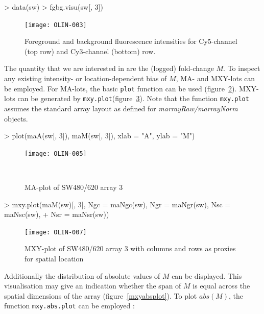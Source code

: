 \documentclass[a4paper,11pt]{article}
\begin{document}
\begin{Schunk}
\begin{Sinput}
> data(sw)
> fgbg.visu(sw[, 3])
\end{Sinput}
\end{Schunk}

\begin{figure}
\centering
\texttt{[image: OLIN-003]}
\caption{Foreground and background fluorescence intensities for Cy5-channel (top row) and Cy3-channel (bottom) row.}
\label{fgbg}
\end{figure}

The  quantity that we are interested in are the (logged) fold-change $M$. To inspect
any existing intensity- or location-dependent bias of $M$, MA- and MXY-lots can be employed.
For MA-lots, the basic \texttt{plot} function can be used (figure~\ref{maplot}). 
MXY-lots can be generated 
by \texttt{mxy.plot}(figure~\ref{mxyplot}). 
Note that the function   \texttt{mxy.plot} assumes the standard array
layout as defined for \textit{marrayRaw/marrayNorm} objects.
  
\begin{Schunk}
\begin{Sinput}
> plot(maA(sw[, 3]), maM(sw[, 3]), xlab = "A", ylab = "M")
\end{Sinput}
\end{Schunk}

\begin{figure}[t]
\centering
\texttt{[image: OLIN-005]}
\caption{MA-plot of SW480/620 array 3}\
\label{maplot}
\end{figure}


\begin{Schunk}
\begin{Sinput}
> mxy.plot(maM(sw)[, 3], Ngc = maNgc(sw), Ngr = maNgr(sw), Nsc = maNsc(sw),
+ Nsr = maNsr(sw))
\end{Sinput}
\end{Schunk}

\begin{figure}
\centering
\texttt{[image: OLIN-007]}
\caption{MXY-plot of SW480/620 array 3 with columns and rows as proxies for spatial location}
\label{mxyplot}
\end{figure}

Additionally the distribution of absolute values of $M$ can be displayed. This visualisation
may give an indication whether the span of $M$ is equal across the spatial dimensions of
the array (figure~\ref{mxyabsplot}). 
To plot $abs(M)$, the function \texttt{mxy.abs.plot} can be employed :
\end{document}
